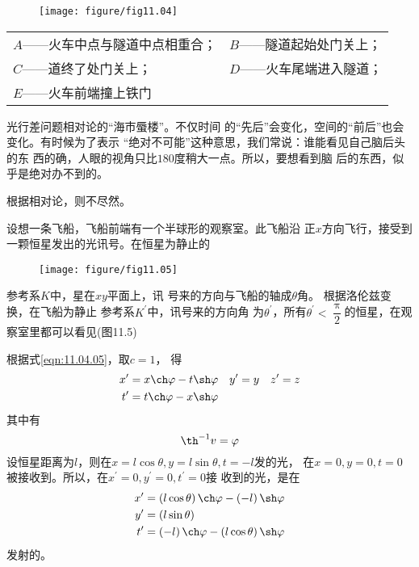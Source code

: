 \documentclass[../outline-of-mechanics.tex]{subfiles}
\begin{document}
\begin{figure}[h]
  \centering
  \texttt{[image: figure/fig11.04]}
  \caption{}
  \label{fig:11.04}
\end{figure}

\begin{center}
  \begin{tabular}{ll}
    $ A $——火车中点与隧道中点相重合； & $ B $——隧道起始处门关上； \\
    $ C $——道终了处门关上；      & $ D $——火车尾端进入隧道； \\
    $ E $——火车前端撞上铁门      &                  \\
  \end{tabular}
\end{center}

\example 光行差问题相对论的“海市蜃楼”。不仅时间
的“先后”会变化，空间的“前后”也会变化。有时候为了表示
“绝对不可能”这种意思，我们常说：谁能看见自己脑后头的东
西的确，人眼的视角只比$ 180 $度稍大一点。所以，要想看到脑
后的东西，似乎是绝对办不到的。

根据相对论，则不尽然。

设想一条飞船，飞船前端有一个半球形的观察室。此飞船沿
正$ x $方向飞行，接受到一颗恒星发出的光讯号。在恒星为静止的

\clearpage\noindent
\begin{wrapfigure}[8]{r}{14em}
  \centering
  \texttt{[image: figure/fig11.05]}
  \caption{}
  \label{fig:11.05}
\end{wrapfigure}
参考系$ K $中，星在$ xy $平面上，讯
号来的方向与飞船的轴成$ \theta $角。
根据洛伦兹变换，在飞船为静止
参考系$ K ^ { \prime }$中，讯号来的方向角
为$ \theta ^ { \prime } $，所有$ \theta ^ { \prime } < \dfrac { \uppi } { 2 } $的恒星，在观
察室里都可以看见(图11.5)

根据式\eqref{eqn:11.04.05}，取$ c = 1 $，
得
\begin{align*}
  x ^ { \prime } & = x \ch \varphi - t \sh \varphi
  \quad y ^ { \prime } = y \quad z ^ { \prime } = z \\
  t ^ { \prime } & = t \ch \varphi - x \sh \varphi
\end{align*}
其中有
\begin{equation*}
  \th ^ { - 1 } v = \varphi
\end{equation*}
设恒星距离为$ l $，则在$ x = l \cos \theta , y = l \sin \theta , t = - l $发的光，
在$ x = 0 , y = 0 , t = 0 $被接收到。所以，在$ x ^ { \prime } = 0 , y ^ { \prime } = 0 , t ^ { \prime } = 0 $接
收到的光，是在
\begin{align*}
  x ^ { \prime } & = \left( l \cos \theta \right) \ch \varphi - \left( - l \right) \sh \varphi \\
  y ^ { \prime } & = \left( l \sin \theta \right)                                              \\
  t ^ { \prime } & = \left( - l \right) \ch \varphi - \left( l \cos \theta \right) \sh \varphi
\end{align*}
发射的。
\end{document}
